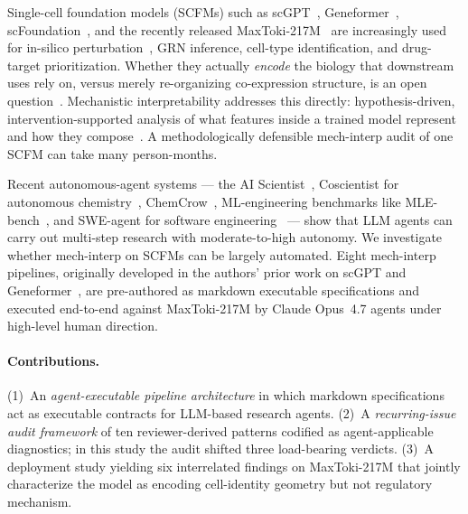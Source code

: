 \documentclass{article}
\newcommand{\maxtoki}{MaxToki-217M\xspace}
\newcommand{\scfm}{SCFM\xspace}
\begin{document}
Single-cell foundation models (\scfm{}s) such as
scGPT~\citep{cui2024scgpt}, Geneformer~\citep{theodoris2023geneformer},
scFoundation~\citep{hao2024scfoundation}, and the recently released
\maxtoki{}~\citep{maxtoki2026} are increasingly used for in-silico
perturbation~\citep{lotfollahi2019scgen,roohani2024gears}, GRN
inference, cell-type identification, and drug-target prioritization.
Whether they actually \emph{encode} the biology that downstream uses
rely on, versus merely re-organizing co-expression structure, is an
open question~\citep{kedzierska2023assessing,liu2023evaluating,wenteler2024perteval}.
Mechanistic interpretability addresses this directly: hypothesis-driven,
intervention-supported analysis of what features inside a trained
model represent and how they
compose~\citep{bricken2023monosemanticity,conmy2023acdc,wang2023ioi,sharkey2025open}.
A methodologically defensible mech-interp audit of one \scfm{} can
take many person-months.

Recent autonomous-agent systems --- the AI
Scientist~\citep{lu2024aiscientist}, Coscientist for autonomous
chemistry~\citep{boiko2023autonomous},
ChemCrow~\citep{mbran2024chemcrow}, ML-engineering benchmarks like
MLE-bench~\citep{chan2024mlebench}, and SWE-agent for software
engineering~\citep{yang2024sweagent} --- show that LLM agents can carry
out multi-step research with moderate-to-high autonomy. We
investigate whether mech-interp on \scfm{}s can be largely automated.
Eight mech-interp pipelines, originally developed in the authors'
prior work on scGPT and
Geneformer~\citep{anon2026attention,anon2026spectral,anon2026topology,anon2026sae,anon2026circuits,anon2026manifold,anon2026exhaustive},
are pre-authored as markdown executable specifications and executed
end-to-end against \maxtoki{} by Claude Opus~4.7 agents under
high-level human direction.

\paragraph{Contributions.} (1)~An \emph{agent-executable pipeline
architecture} in which markdown specifications act as executable
contracts for LLM-based research agents. (2)~A \emph{recurring-issue
audit framework} of ten reviewer-derived patterns codified as
agent-applicable diagnostics; in this study the audit shifted three
load-bearing verdicts. (3)~A deployment study yielding six
interrelated findings on \maxtoki{} that jointly characterize the
model as encoding cell-identity geometry but not regulatory mechanism.
\end{document}
